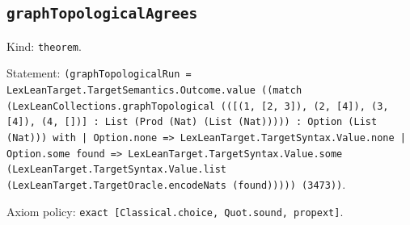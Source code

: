 \documentclass[11pt]{article}
\begin{document}
\subsection*{\texttt{graphTopologicalAgrees}}
\noindent Kind: \texttt{theorem}.\par
\noindent Statement: \texttt{(graphTopologicalRun = LexLeanTarget.TargetSemantics.Outcome.value ((match (LexLeanCollections.graphTopological (([(1, [2, 3]), (2, [4]), (3, [4]), (4, [])] : List (Prod (Nat) (List (Nat))))) : Option (List (Nat))) with | Option.none => LexLeanTarget.TargetSyntax.Value.none | Option.some found => LexLeanTarget.TargetSyntax.Value.some (LexLeanTarget.TargetSyntax.Value.list (LexLeanTarget.TargetOracle.encodeNats (found))))) (3473))}.\par
\noindent Axiom policy: \texttt{exact [Classical.choice, Quot.sound, propext]}.\par
\end{document}
